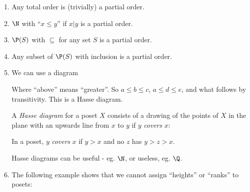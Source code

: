 \documentclass[a4paper]{article}
\begin{document}
\begin{eg}\leavevmode
  \begin{enumerate}
    \item Any total order is (trivially) a partial order.
    \item $\N$ with ``$x\leq y$'' if $x | y$ is a partial order.
    \item $\P(S)$ with $\subseteq$ for any set $S$ is a partial order.
    \item Any subset of $\P(S)$ with inclusion is a partial order.
    \item We can use a diagram
      \begin{center}
      \end{center}
      Where ``above'' means ``greater''. So $a \leq b\leq c$, $a \leq d\leq e$, and what follows by transitivity. This is a Hasse diagram.

      \begin{defi}
        A \emph{Hasse diagram} for a poset $X$ consists of a drawing of the points of $X$ in the plane with an upwards line from $x$ to $y$ if $y$ \emph{covers} $x$:
      \end{defi}
      \begin{defi}[Cover]
        In a poset, $y$ \emph{covers} $x$ if $y > x$ and no $z$ has $y > z > x$.
      \end{defi}
      Hasse diagrams can be useful - eg. $\N$, or useless, eg. $\Q$.
    \item The following example shows that we cannot assign ``heights'' or ``ranks'' to posets:
      \begin{center}
\end{center}
\end{enumerate}
\end{eg}
\end{document}
